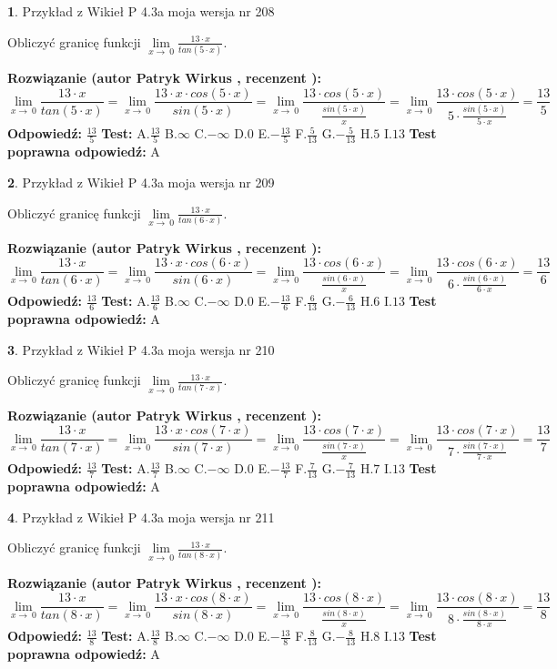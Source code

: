 \documentclass[12pt, a4paper]{article}
\theoremstyle{definition} %
\newtheorem{zad}{}
\newcommand{\zadStart}[1]{\begin{zad}#1\newline}
\newcommand{\zadStop}{\end{zad}}
\newcommand{\rozwStart}[2]{\noindent \textbf{Rozwiązanie (autor #1 , recenzent #2): }\newline}
\newcommand{\rozwStop}{\newline}
\newcommand{\odpStart}{\noindent \textbf{Odpowiedź:}\newline}
\newcommand{\odpStop}{\newline}
\newcommand{\testStart}{\noindent \textbf{Test:}\newline}
\newcommand{\testStop}{\newline}
\newcommand{\kluczStart}{\noindent \textbf{Test poprawna odpowiedź:}\newline}
\newcommand{\kluczStop}{\newline}
\begin{document}
\zadStart{Przykład z Wikieł P 4.3a moja wersja nr 208}


Obliczyć granicę funkcji $\lim\limits_{x\to\ 0}\frac{13 \cdot x}{tan(5 \cdot x)}$.
\zadStop
\rozwStart{Patryk Wirkus}{}
$$\lim\limits_{x\to\ 0}\frac{13 \cdot x}{tan(5 \cdot x)}=\lim\limits_{x\to\ 0}\frac{13 \cdot x \cdot cos(5 \cdot x)}{sin(5 \cdot x)}=\lim\limits_{x\to\ 0}\frac{13 \cdot cos(5 \cdot x)}{\frac{sin(5 \cdot x)}{x}}=\lim\limits_{x\to\ 0}\frac{13 \cdot cos(5 \cdot x)}{5 \cdot \frac{sin(5 \cdot x)}{5 \cdot x}} = \frac{13}{5}$$
\rozwStop
\odpStart
$\frac{13}{5}$
\odpStop
\testStart
A.$\frac{13}{5}$
B.$\infty$
C.$-\infty$
D.$0$
E.$-\frac{13}{5}$
F.$\frac{5}{13}$
G.$-\frac{5}{13}$
H.$5$
I.$13$
\testStop
\kluczStart
A
\kluczStop



\zadStart{Przykład z Wikieł P 4.3a moja wersja nr 209}


Obliczyć granicę funkcji $\lim\limits_{x\to\ 0}\frac{13 \cdot x}{tan(6 \cdot x)}$.
\zadStop
\rozwStart{Patryk Wirkus}{}
$$\lim\limits_{x\to\ 0}\frac{13 \cdot x}{tan(6 \cdot x)}=\lim\limits_{x\to\ 0}\frac{13 \cdot x \cdot cos(6 \cdot x)}{sin(6 \cdot x)}=\lim\limits_{x\to\ 0}\frac{13 \cdot cos(6 \cdot x)}{\frac{sin(6 \cdot x)}{x}}=\lim\limits_{x\to\ 0}\frac{13 \cdot cos(6 \cdot x)}{6 \cdot \frac{sin(6 \cdot x)}{6 \cdot x}} = \frac{13}{6}$$
\rozwStop
\odpStart
$\frac{13}{6}$
\odpStop
\testStart
A.$\frac{13}{6}$
B.$\infty$
C.$-\infty$
D.$0$
E.$-\frac{13}{6}$
F.$\frac{6}{13}$
G.$-\frac{6}{13}$
H.$6$
I.$13$
\testStop
\kluczStart
A
\kluczStop



\zadStart{Przykład z Wikieł P 4.3a moja wersja nr 210}


Obliczyć granicę funkcji $\lim\limits_{x\to\ 0}\frac{13 \cdot x}{tan(7 \cdot x)}$.
\zadStop
\rozwStart{Patryk Wirkus}{}
$$\lim\limits_{x\to\ 0}\frac{13 \cdot x}{tan(7 \cdot x)}=\lim\limits_{x\to\ 0}\frac{13 \cdot x \cdot cos(7 \cdot x)}{sin(7 \cdot x)}=\lim\limits_{x\to\ 0}\frac{13 \cdot cos(7 \cdot x)}{\frac{sin(7 \cdot x)}{x}}=\lim\limits_{x\to\ 0}\frac{13 \cdot cos(7 \cdot x)}{7 \cdot \frac{sin(7 \cdot x)}{7 \cdot x}} = \frac{13}{7}$$
\rozwStop
\odpStart
$\frac{13}{7}$
\odpStop
\testStart
A.$\frac{13}{7}$
B.$\infty$
C.$-\infty$
D.$0$
E.$-\frac{13}{7}$
F.$\frac{7}{13}$
G.$-\frac{7}{13}$
H.$7$
I.$13$
\testStop
\kluczStart
A
\kluczStop



\zadStart{Przykład z Wikieł P 4.3a moja wersja nr 211}


Obliczyć granicę funkcji $\lim\limits_{x\to\ 0}\frac{13 \cdot x}{tan(8 \cdot x)}$.
\zadStop
\rozwStart{Patryk Wirkus}{}
$$\lim\limits_{x\to\ 0}\frac{13 \cdot x}{tan(8 \cdot x)}=\lim\limits_{x\to\ 0}\frac{13 \cdot x \cdot cos(8 \cdot x)}{sin(8 \cdot x)}=\lim\limits_{x\to\ 0}\frac{13 \cdot cos(8 \cdot x)}{\frac{sin(8 \cdot x)}{x}}=\lim\limits_{x\to\ 0}\frac{13 \cdot cos(8 \cdot x)}{8 \cdot \frac{sin(8 \cdot x)}{8 \cdot x}} = \frac{13}{8}$$
\rozwStop
\odpStart
$\frac{13}{8}$
\odpStop
\testStart
A.$\frac{13}{8}$
B.$\infty$
C.$-\infty$
D.$0$
E.$-\frac{13}{8}$
F.$\frac{8}{13}$
G.$-\frac{8}{13}$
H.$8$
I.$13$
\testStop
\kluczStart
A
\kluczStop
\end{document}
